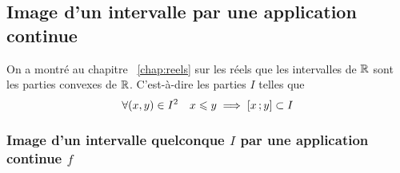 \subsection{Image d'un intervalle par une application continue}

\begin{rappel}
  On a montré au chapitre~
\ref{chap:reels} sur les réels que les intervalles de \(\mathbb{R}\) sont les parties convexes de \(\mathbb{R}\). C'est-à-dire les parties \(I\) telles que
  \begin{equation}
    \forall (x,y) \in I^2 \quad x \leqslant y \implies \left[ x \, ;  y \right] \subset I
  \end{equation}
\end{rappel}

\subsubsection[Image continue d'un intervalle quelconque]{Image d'un intervalle quelconque \(I\) par une application continue \(f\)}

